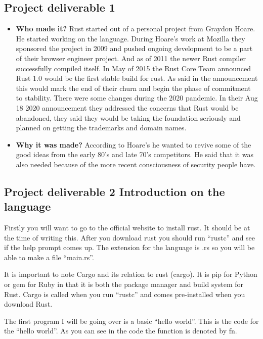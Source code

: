 \documentclass{article}
\theoremstyle{theorem}
\theoremstyle{definition}
\theoremstyle{remark}
\begin{document}
\subsection{Project deliverable 1 }
    \begin{itemize}

\item \textbf{Who made it?}  Rust started out of a personal project from Graydon Hoare. He started working on the language. During Hoare’s work at Mozilla they sponsored the project in 2009 and pushed ongoing development to be a part of their browser engineer project. And as of 2011 the newer Rust compiler successfully compiled itself.  In May of 2015 the Rust Core Team announced Rust 1.0 would be the first stable build for rust. As said in the announcement this would mark the end of their churn and begin the phase of commitment to stability. There were some changes during the 2020 pandemic. In their Aug 18 2020 announcement they addressed the concerns that Rust would be abandoned, they said they would be taking the foundation seriously and planned on getting the trademarks and domain names. 
\item \textbf{Why it was made?}  According to Hoare’s he wanted to revive some of the good ideas from the early 80’s and late 70’s competitors. He said that it was also needed because of the more recent consciousness of security people have.

\end{itemize}

\subsection{Project deliverable 2 Introduction on the language}
\medskip 
Firstly you will want to go to the official website to install rust. It should be  at the time of writing this.\cite{IR} After you download rust you should run “rustc” and see if the help prompt comes up. The extension for the language is .rs so you will be able to make a file “main.rs”. 

It is important to note Cargo and its relation to rust (cargo). It is pip for Python or gem for Ruby in that it is both the package manager and build system for Rust. Cargo is called when you run “rustc” and comes pre-installed when you download Rust.

The first program I will be going over is a basic “hello world”. This is the code for the “hello world”. As you can see in the code the function is denoted by fn.
\end{document}
